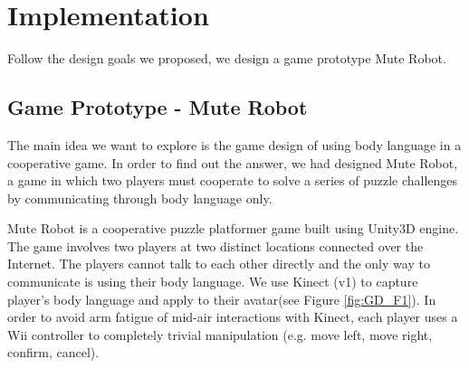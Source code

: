 \documentclass{sigchi}
\begin{document}
\section{Implementation}

Follow the design goals we proposed, we design a game prototype Mute Robot.

\subsection{Game Prototype - Mute Robot}

The main idea we want to explore is the game design of using body language in a cooperative game. In order to find out the answer, we had designed Mute Robot, a game in which two players must cooperate to solve a series of puzzle challenges by communicating through body language only.

Mute Robot is a cooperative puzzle platformer game built using Unity3D \cite{unity} engine. The game involves two players at two distinct locations connected over the Internet. The players cannot talk to each other directly and the only way to communicate is using their body language. We use Kinect (v1) to capture player’s body language and apply to their avatar(see Figure \ref{fig:GD_F1}). In order to avoid arm fatigue of mid-air interactions with Kinect, each player uses a Wii controller to completely trivial manipulation (e.g. move left, move right, confirm, cancel).  
\end{document}
